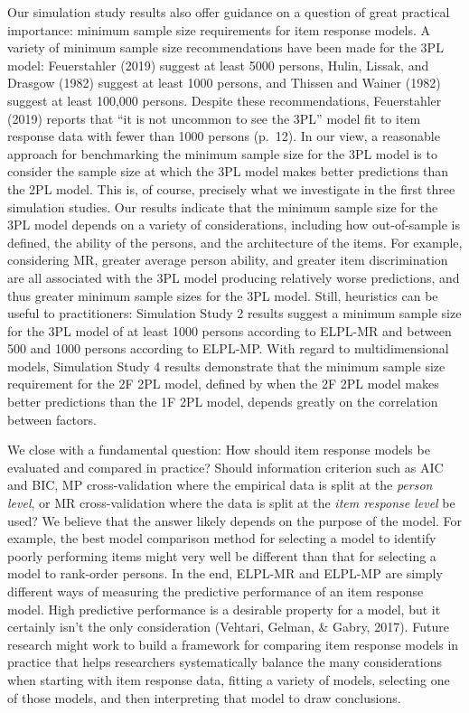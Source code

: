 \documentclass[
  english,
  man,floatsintext]{apa7}
\begin{document}
Our simulation study results also offer guidance on a question of great practical importance: minimum sample size requirements for item response models. A variety of minimum sample size recommendations have been made for the 3PL model: Feuerstahler (2019) suggest at least 5000 persons, Hulin, Lissak, and Drasgow (1982) suggest at least 1000 persons, and Thissen and Wainer (1982) suggest at least 100,000 persons. Despite these recommendations, Feuerstahler (2019) reports that ``it is not uncommon to see the 3PL'' model fit to item response data with fewer than 1000 persons (p.~12). In our view, a reasonable approach for benchmarking the minimum sample size for the 3PL model is to consider the sample size at which the 3PL model makes better predictions than the 2PL model. This is, of course, precisely what we investigate in the first three simulation studies. Our results indicate that the minimum sample size for the 3PL model depends on a variety of considerations, including how out-of-sample is defined, the ability of the persons, and the architecture of the items. For example, considering MR, greater average person ability, and greater item discrimination are all associated with the 3PL model producing relatively worse predictions, and thus greater minimum sample sizes for the 3PL model. Still, heuristics can be useful to practitioners: Simulation Study 2 results suggest a minimum sample size for the 3PL model of at least 1000 persons according to ELPL-MR and between 500 and 1000 persons according to ELPL-MP. With regard to multidimensional models, Simulation Study 4 results demonstrate that the minimum sample size requirement for the 2F 2PL model, defined by when the 2F 2PL model makes better predictions than the 1F 2PL model, depends greatly on the correlation between factors.

We close with a fundamental question: How should item response models be evaluated and compared in practice? Should information criterion such as AIC and BIC, MP cross-validation where the empirical data is split at the \emph{person level}, or MR cross-validation where the data is split at the \emph{item response level} be used? We believe that the answer likely depends on the purpose of the model. For example, the best model comparison method for selecting a model to identify poorly performing items might very well be different than that for selecting a model to rank-order persons. In the end, ELPL-MR and ELPL-MP are simply different ways of measuring the predictive performance of an item response model. High predictive performance is a desirable property for a model, but it certainly isn't the only consideration (Vehtari, Gelman, \& Gabry, 2017). Future research might work to build a framework for comparing item response models in practice that helps researchers systematically balance the many considerations when starting with item response data, fitting a variety of models, selecting one of those models, and then interpreting that model to draw conclusions.
\end{document}
